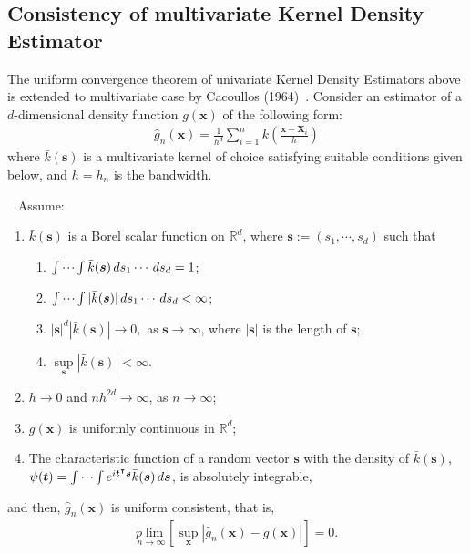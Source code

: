 \subsection{Consistency of multivariate Kernel Density Estimator }
The uniform convergence theorem of univariate Kernel Density Estimators above is extended to multivariate case by Cacoullos (1964)~\cite{Theo}. Consider an estimator of a $d$-dimensional density function $g(\boldsymbol{x})$ of the following form:
\begin{gather*}
\widehat{g}_n(\boldsymbol{x}) = \frac{1}{h^{d}} \sum_{i=1}^{n}\bar{k}\left( \frac{\boldsymbol{x} - \boldsymbol{X}_i}{h}\right)
\end{gather*}
where $\bar{k}(\boldsymbol{s})$ is a multivariate kernel of choice satisfying suitable conditions given below, and $h = h_n$ is the bandwidth. 
\begin{theorem}~\cite{Theo}
	Assume:
	\begin{enumerate}
		\item $\bar{k}(\boldsymbol{s})$ is a Borel scalar function on $\mathbb{R}^{d}$, where $\boldsymbol{s} := (s_1, \cdots, s_{d})$ such that 
		\begin{enumerate}
			\item $\idotsint \bar{k}(\boldsymbol{s}) \,ds_1\cdots \,ds_{d} = 1$;
			\item $\idotsint | \bar{k}(\boldsymbol{s}) | \,ds_1\cdots \,ds_{d}<\infty$;
			\item $|\boldsymbol{s}|^{d}|\bar{k}(\boldsymbol{s})| \to 0,$ as $\boldsymbol{s} \to \infty$, where $|\boldsymbol{s}|$ is the length of $\boldsymbol{s}$;
			\item $\underset{\boldsymbol{s}}{\sup} | \bar{k}(\boldsymbol{s}) | < \infty$.
		\end{enumerate}
		\item $h \to 0$ and $nh^{2d} \to \infty$, as $n \to \infty$;
		\item $g(\boldsymbol{x})$ is uniformly continuous in $\mathbb{R}^{d}$;
		\item The characteristic function of a random vector $\boldsymbol{s}$ with the density  of $\bar{k}(\boldsymbol{s})$, $\psi(\boldsymbol{t}) = \idotsint e^{i\boldsymbol{t}^{\intercal}\boldsymbol{s}} \bar{k}(\boldsymbol{s})\,d\boldsymbol{s}$,  is absolutely integrable,
	\end{enumerate}
	and then, $\widehat{g}_n(\boldsymbol{x})$ is uniform consistent, that is,
	\begin{gather*}
	\underset{n \to \infty}{p\lim}  \left[ \underset{\boldsymbol{x}}{\sup} \left|\widehat{g}_n(\boldsymbol{x}) - g(\boldsymbol{x}) \right| \right] = 0.
	\end{gather*}
\end{theorem}
